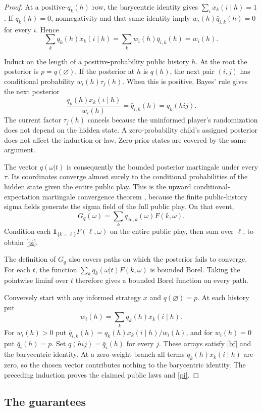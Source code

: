 \documentclass[11pt,a4paper]{article}
\theoremstyle{definition}
\theoremstyle{remark}
\begin{document}
\begin{proof}
At a positive-$q_k(h)$ row, the barycentric identity gives
$\sum_i x_k(i\mid h)=1$. If $q_k(h)=0$, nonnegativity and that same
identity imply $w_i(h)\bar q_{i,k}(h)=0$ for every $i$. Hence
\[
 \sum_k q_k(h)x_k(i\mid h)
 =\sum_k w_i(h)\bar q_{i,k}(h)=w_i(h).
\]

Induct on the length of a positive-probability public history $h$.
At the root the posterior is $p=q(\varnothing)$. If the posterior at $h$
is $q(h)$, the next pair $(i,j)$ has conditional probability
$w_i(h)\tau_j(h)$. When this is positive, Bayes' rule gives the next
posterior
\[
 \frac{q_k(h)x_k(i\mid h)}{w_i(h)}
 =\bar q_{i,k}(h)=q_k(hij).
\]
The current factor $\tau_j(h)$ cancels because the uninformed player's
randomization does not depend on the hidden state. A zero-probability
child's assigned posterior does not affect the induction or law.
Zero-prior states are covered by the same argument.

The vector $q(\omega|t)$ is consequently the bounded posterior
martingale under every $\tau$. Its coordinates converge almost surely
to the conditional probabilities of the hidden state given the entire
public play. This is the upward conditional-expectation martingale
convergence theorem \cite[Theorem~4.6.8]{Durrett}, because the finite public-history sigma fields
generate the sigma field of the full public play. On that event,
\[
 G_q(\omega)=\sum_k q_{\infty,k}(\omega)F(k,\omega).
\]
Condition each $\mathbf1_{\{k=\ell\}}F(\ell,\omega)$ on the entire
public play, then sum over $\ell$, to obtain \eqref{pi}.

The definition of $G_q$ also covers paths on which the posterior fails
to converge. For each $t$, the function
$\sum_k q_k(\omega|t)F(k,\omega)$ is bounded Borel. Taking the pointwise
liminf over $t$ therefore gives a bounded Borel function on every path.

Conversely start with any informed strategy $x$ and $q(\varnothing)=p$.
At each history put
\[
 w_i(h)=\sum_k q_k(h)x_k(i\mid h).
\]
For $w_i(h)>0$ put
$\bar q_{i,k}(h)=q_k(h)x_k(i\mid h)/w_i(h)$, and for $w_i(h)=0$ put
$\bar q_i(h)=p$. Set $q(hij)=\bar q_i(h)$ for every $j$. These arrays
satisfy \eqref{bf} and the barycentric identity. At a zero-weight branch all terms
$q_k(h)x_k(i\mid h)$ are zero, so the chosen vector contributes nothing
to the barycentric identity. The preceding induction proves the claimed
public laws and \eqref{pi}.
\end{proof}

\subsection{The guarantees}
\end{document}
